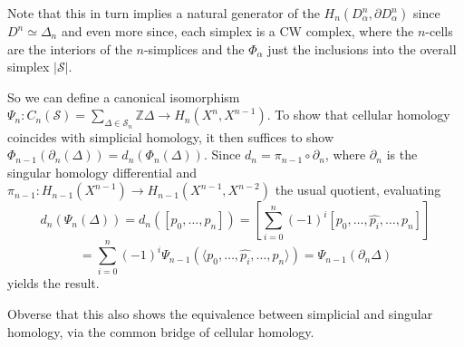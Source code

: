 Note that this in turn implies a natural generator of the \(H_n(D^n_\alpha, \partial D^n_\alpha)\) since \(D^n \simeq \Delta_n\)
and even more since, each simplex is a CW complex, where the \( n \)-cells are the interiors of the \( n \)-simplices and the \( \Phi_\alpha \)
just the inclusions into the overall simplex \( |\mathcal{S}| \). 

So we can define a canonical isomorphism 
\( \Psi_n : C_n(\mathcal{S}) = \sum_{\Delta \in \mathcal{S}_n} \mathbb{Z}\Delta \to H_n(X^n, X^{n-1}) \).
To show that cellular homology coincides with simplicial homology, it then suffices to show
\( \Phi_{n-1}(\partial_n(\Delta)) = d_n(\Phi_n(\Delta)) \). 
Since \( d_n = \pi_{n-1} \circ \partial_n \), where \( \partial_n \) 
is the singular homology differential and \( \pi_{n-1} : H_{n-1}(X^{n-1}) \to H_{n-1}(X^{n-1}, X^{n-2}) \) the usual quotient,
evaluating
\[
d_n (\Psi_n (\Delta)) = d_n ([p_0, \ldots , p_n]) 
= \left[ \sum_{i=0}^n (-1)^i [p_0, \ldots, \hat{p_i}, \ldots , p_n] \right]
\]
\[
= \sum_{i=0}^n (-1)^i \Psi_{n-1} ( \langle p_0, \ldots, \hat{p_i}, \ldots , p_n \rangle )
= \Psi_{n-1} (\partial_n \Delta)
\]
yields the result.

Obverse that this also shows the equivalence between simplicial and singular homology, via the common bridge of cellular homology.

